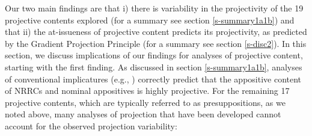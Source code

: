 \documentclass[11pt,fleqn]{article}
\newcommand{\6}{\mbox{$[\hspace*{-.6mm}[$}}
\newcommand{\9}{\mbox{$]\hspace*{-.6mm}]$}}
\begin{document}
Our two main findings are that i) there is variability in the projectivity of the 19 projective contents explored (for a summary see section \ref{s-summary1a1b}) and that ii) the at-issueness of projective content predicts its projectivity, as predicted by the Gradient Projection Principle (for a summary see section \ref{s-disc2}). In this section, we discuss implications of our findings for analyses of projective content, starting with the first finding.  As discussed in section \ref{s-summary1a1b}, analyses of conventional implicatures (e.g., \citealt{potts05,murray2014,anderbois-etal2015}) correctly predict that the appositive content of NRRCs and nominal appositives is highly projective. For the remaining 17 projective contents, which are typically referred to as presuppositions, as we noted above, many analyses of projection that have been developed cannot account for the observed projection variability:
\end{document}
